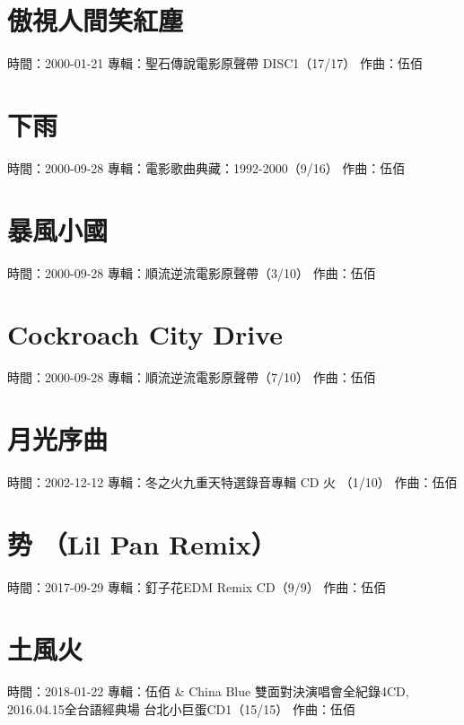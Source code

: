 \documentclass[UTF8,a4paper,oneside,twocolumn,12pt]{ctexbook}
\newcommand{\infopair}[2]{\textbullet #1：#2}
\newcommand{\zq}[1][伍佰]{\infopair{作曲}{#1}}
\newcommand{\zj}[1]{\infopair{專輯}{#1}}
\newcommand{\sj}[1]{\infopair{時間}{#1}}
\newenvironment{info}{\begin{flushleft}\kaishu
	}
	{\end{flushleft}\normalsize\yahei\par}
\begin{document}
\section{傲視人間笑紅塵}
\begin{info}
	\sj{2000-01-21}
	\zj{聖石傳說電影原聲帶 DISC1（17/17）}
	\zq
\end{info}

\section{下雨}
\begin{info}
	\sj{2000-09-28}
	\zj{電影歌曲典藏：1992-2000（9/16）}
	\zq
\end{info}

\section{暴風小國}
\begin{info}
	\sj{2000-09-28}
	\zj{順流逆流電影原聲帶（3/10）}
	\zq
\end{info}

\section{Cockroach City Drive}
\begin{info}
	\sj{2000-09-28}
	\zj{順流逆流電影原聲帶（7/10）}
	\zq
\end{info}

\section{月光序曲}
\begin{info}
	\sj{2002-12-12}
	\zj{冬之火九重天特選錄音專輯 CD 火 （1/10）}
	\zq
\end{info}

\section{势 （Lil Pan Remix）}
\begin{info}
	\sj{2017-09-29}
	\zj{釘子花EDM Remix CD（9/9）}
	\zq
\end{info}

\section{土風火}
\begin{info}
	\sj{2018-01-22}
	\zj{伍佰 \& China Blue 雙面對決演唱會全紀錄4CD,
		2016.04.15全台語經典場 台北小巨蛋CD1（15/15）}
	\zq
\end{info}
\end{document}
